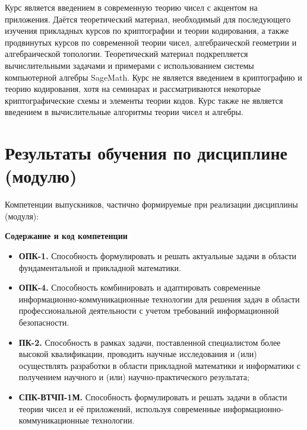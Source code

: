 \documentclass[a4paper, 12pt]{article}
\begin{document}
Курс является введением в современную теорию чисел с акцентом на приложения. Даётся теоретический материал, необходимый для последующего изучения прикладных курсов по криптографии и теории кодирования, а также продвинутых курсов по современной теории чисел, алгебраической геометрии и алгебраической топологии. Теоретический материал подкрепляется вычислительными задачами и примерами с использованием системы компьютерной алгебры SageMath. Курс не является введением в криптографию и теорию кодирования, хотя на семинарах и рассматриваются некоторые криптографические схемы и элементы теории кодов. Курс также не является введением в вычислительные алгоритмы теории чисел и алгебры.

\section{Результаты обучения по дисциплине (модулю)}

Компетенции выпускников, частично формируемые при реализации дисциплины (модуля):

{\bf Содержание и код компетенции}
\begin{itemize}[noitemsep,topsep=0pt]
    \item {\bf ОПК-1.} Способность формулировать и решать актуальные задачи в области фундаментальной и прикладной математики.
    
    \item {\bf ОПК-4.} Способность комбинировать и адаптировать современные информационно-коммуникационные технологии для решения задач в области профессиональной деятельности с учетом требований информационной безопасности.
    
    \item {\bf ПК-2.} Способность в рамках задачи, поставленной специалистом более высокой квалификации, проводить научные исследования и (или) осуществлять разработки в области прикладной математики и информатики с получением научного и (или) научно-практического результата;
    
    \item {\bf СПК-ВТЧП-1М.} Способность формулировать и решать задачи в области теории чисел и её приложений, используя современные информационно-комму\-никационные технологии.
\end{itemize}
\end{document}

